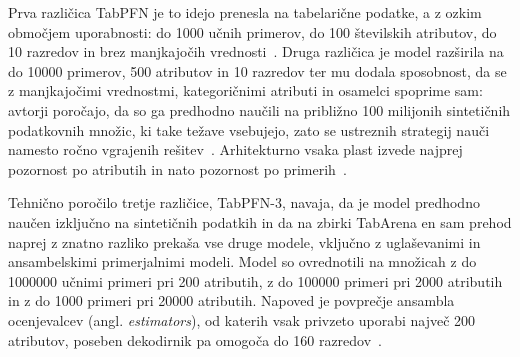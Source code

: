 \documentclass[a4paper,12pt,openright]{book}
\begin{document}
Prva različica TabPFN je to idejo prenesla na
tabelarične podatke, a z ozkim območjem uporabnosti: do 1000 učnih primerov, do
100 številskih atributov, do 10 razredov in brez manjkajočih
vrednosti~\cite{hollmann2023tabpfn}. Druga
različica je model razširila na do \num{10000}
primerov, 500 atributov in 10 razredov ter mu dodala sposobnost, da se z
manjkajočimi vrednostmi, kategoričnimi atributi in osamelci spoprime sam:
avtorji poročajo, da so ga predhodno naučili na približno 100 milijonih
sintetičnih podatkovnih množic, ki take težave vsebujejo, zato se ustreznih
strategij nauči namesto ročno vgrajenih rešitev~\cite{hollmann2025tabpfn}.
Arhitekturno vsaka plast
izvede najprej pozornost po atributih in nato pozornost po
primerih~\cite{hollmann2025tabpfn}.

Tehnično poročilo tretje različice, TabPFN-3, navaja, da je model predhodno
naučen izključno na sintetičnih podatkih in da na zbirki TabArena en sam
prehod naprej z znatno razliko prekaša vse druge modele, vključno z
uglaševanimi in ansambelskimi primerjalnimi modeli. Model so ovrednotili na
množicah z do \num{1000000} učnimi primeri pri 200 atributih, z do
\num{100000} primeri pri 2000 atributih in z do 1000 primeri pri \num{20000}
atributih. Napoved je povprečje ansambla ocenjevalcev (angl.
\emph{estimators}), od katerih vsak privzeto uporabi največ 200 atributov,
poseben dekodirnik pa omogoča do 160 razredov~\cite{grinsztajn2026tabpfn3}.
\end{document}
